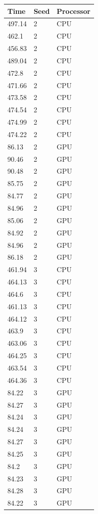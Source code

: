 \begin{table}
\caption{CPU vs GPU Total Runtime Seeds 2 and 3}
\centering
 \begin{longtable}{ | l | l | l |}
    \hline
    Time & Seed & Processor \\ \hline
    497.14 & 2 & CPU \\ \hline
    462.1 & 2 & CPU \\ \hline
    456.83 & 2 & CPU \\ \hline
    489.04 & 2 & CPU \\ \hline
    472.8 & 2 & CPU \\ \hline
    471.66 & 2 & CPU \\ \hline
    473.58 & 2 & CPU \\ \hline
    474.54 & 2 & CPU \\ \hline
    474.99 & 2 & CPU \\ \hline
    474.22 & 2 & CPU \\ \hline
    86.13 & 2 & GPU \\ \hline
    90.46 & 2 & GPU \\ \hline
    90.48 & 2 & GPU \\ \hline
    85.75 & 2 & GPU \\ \hline
    84.77 & 2 & GPU \\ \hline
    84.96 & 2 & GPU \\ \hline
    85.06 & 2 & GPU \\ \hline
    84.92 & 2 & GPU \\ \hline
    84.96 & 2 & GPU \\ \hline
    86.18 & 2 & GPU \\ \hline
    461.94 & 3 & CPU \\ \hline
    464.13 & 3 & CPU \\ \hline
    464.6 & 3 & CPU \\ \hline
    461.13 & 3 & CPU \\ \hline
    464.12 & 3 & CPU \\ \hline
    463.9 & 3 & CPU \\ \hline
    463.06 & 3 & CPU \\ \hline
    464.25 & 3 & CPU \\ \hline
    463.54 & 3 & CPU \\ \hline
    464.36 & 3 & CPU \\ \hline
    84.22 & 3 & GPU \\ \hline
    84.27 & 3 & GPU \\ \hline
    84.24 & 3 & GPU \\ \hline
    84.24 & 3 & GPU \\ \hline
    84.27 & 3 & GPU \\ \hline
    84.25 & 3 & GPU \\ \hline
    84.2 & 3 & GPU \\ \hline
    84.23 & 3 & GPU \\ \hline
    84.28 & 3 & GPU \\ \hline
    84.22 & 3 & GPU \\ \hline
    \end{longtable}
\label{table:CPU vs GPU total runtime part 2}
\end{table}
\bigskip


